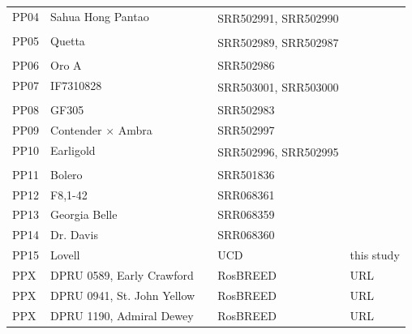 \documentclass[12pt]{article}
\begin{document}
\begin{center}
\begin{longtable}{lllll}
                 \\
                 PP04 &Sahua Hong Pantao & &\multirow{2}{1cm}{SRR502991, SRR502990} &\citep{verde2013high}\\
                 \\
                 PP05 &Quetta & &\multirow{2}{1cm}{SRR502989, SRR502987} &\citep{verde2013high}\\
                 \\
                 PP06 &Oro A & &SRR502986 &\citep{verde2013high}\\
                 PP07 &IF7310828 & &\multirow{2}{1cm}{SRR503001, SRR503000} &\citep{verde2013high}\\
                 \\
                 PP08 &GF305 & &SRR502983 &\citep{verde2013high}\\
                 PP09 &Contender $\times$ Ambra & &SRR502997 &\citep{verde2013high}\\
                 PP10 &Earligold & &\multirow{2}{1cm}{SRR502996, SRR502995} &\citep{verde2013high}\\
                 \\
                 PP11 &Bolero & &SRR501836 &\citep{verde2013high}\\
                 PP12 &F8,1-42 & &SRR068361 &\citep{ahmad2011whole} \\
                 PP13 &Georgia Belle & &SRR068359 &\citep{ahmad2011whole} \\
                 PP14 &Dr. Davis & &SRR068360 &\citep{ahmad2011whole} \\
                 PP15 &Lovell & &UCD &this study\\
                 PP{\color{red}X} &DPRU 0589, Early Crawford& &RosBREED &URL \\
                 PP{\color{red}X} &DPRU 0941, St. John Yellow & &RosBREED &URL \\
                 PP{\color{red}X} &DPRU 1190, Admiral Dewey& &RosBREED &URL \\

\end{longtable}
\end{center}
\end{document}
